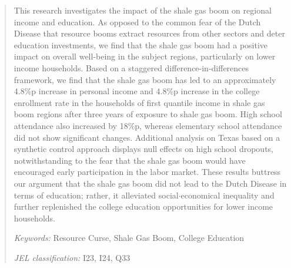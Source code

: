 \documentclass[12pt]{article}
\begin{document}
	
	\begin{singlespace}
		\maketitle
	\end{singlespace}
	
	\begin{abstract}	
		
		\noindent 
		\begin{singlespace}
			This research investigates the impact of the shale gas boom on regional income and education. 
    As opposed to the common fear of the Dutch Disease that resource booms 
    extract resources from other sectors and deter education investments,
    we find that the shale gas boom had a positive impact on overall well-being in the subject regions,
    particularly on lower income households.
    Based on a staggered difference-in-differences framework, 
    we find that the shale gas boom has led to an approximately 4.8\%p increase in personal income and 
    4.8\%p increase in the college enrollment rate in the households of first quantile income in shale gas boom regions after three years of exposure to shale gas boom.
    High school attendance also increased by 18\%p, whereas elementary school attendance did not show significant changes.
    Additional analysis on Texas based on a synthetic control approach displays
    null effects on high school dropouts,
    notwithstanding to the fear that the shale gas boom would have encouraged early participation in the labor market.
    These results buttress our argument that the shale gas boom did not lead to the Dutch Disease in terms of education;
    rather, it alleviated social$\cdot$economical inequality and further replenished the college education opportunities for lower income households.
			
		\end{singlespace}
		
		\bigskip
		\noindent \emph{Keywords:} Resource Curse, Shale Gas Boom, College Education
		
		\noindent \emph{JEL classification:} I23, I24, Q33
		

	\end{abstract}		


\newpage












\newpage


\printbibliography


\appendix

\onecolumn 

\end{document}
